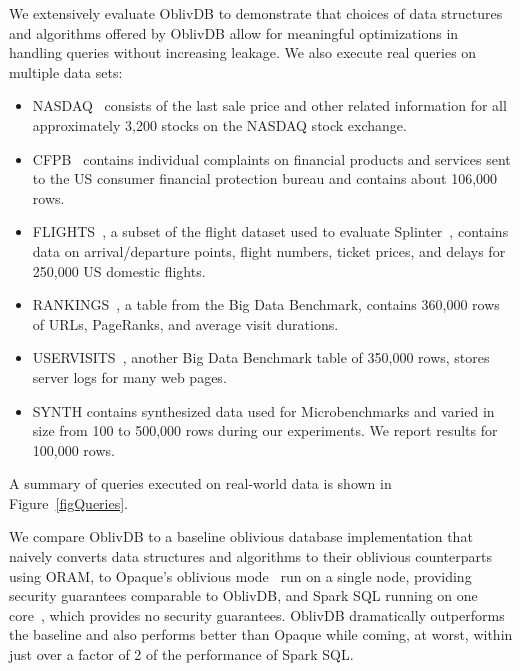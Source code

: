 \documentclass[letterpaper,twocolumn,10pt]{article}
\def\name/{OblivDB}
\begin{document}
We extensively evaluate \name/ to demonstrate that choices of data structures and algorithms offered by \name/ allow for meaningful optimizations in handling queries without increasing leakage. We also execute real queries on multiple data sets:
\begin{itemize}[itemsep=0pt,parsep=0pt]
\item NASDAQ~\cite{NASDAQ} consists of the last sale price and other related information for all approximately 3,200 stocks on the NASDAQ stock exchange.

\item CFPB~\cite{CFPB} contains individual complaints on financial products and services sent to the US consumer financial protection bureau and contains about 106,000 rows.

\item FLIGHTS~\cite{FLIGHT}, a subset of the flight dataset used to evaluate Splinter~\cite{WYG+17}, contains data on arrival/departure points, flight numbers, ticket prices, and delays for 250,000 US domestic flights.

\item RANKINGS~\cite{BDB}, a table from the Big Data Benchmark, contains 360,000 rows of URLs, PageRanks, and average visit durations.

\item USERVISITS~\cite{BDB}, another Big Data Benchmark table of 350,000 rows, stores server logs for many web pages. 

\item SYNTH contains synthesized data used for Microbenchmarks and varied in size from 100 to 500,000 rows during our experiments. We report results for 100,000 rows. 
\end{itemize}
A summary of queries executed on real-world data is shown in Figure~\ref{figQueries}. 

We compare \name/ to a baseline oblivious database implementation that naively converts data structures and algorithms to their oblivious counterparts using ORAM, to Opaque's oblivious mode~\cite{ZDB+17} run on a single node, providing security guarantees comparable to \name/, and Spark SQL running on one core~\cite{SparkSQL}, which provides no security guarantees. \name/ dramatically outperforms the baseline and also performs better than Opaque while coming, at worst, within just over a factor of 2 of the performance of Spark SQL. 
\end{document}
